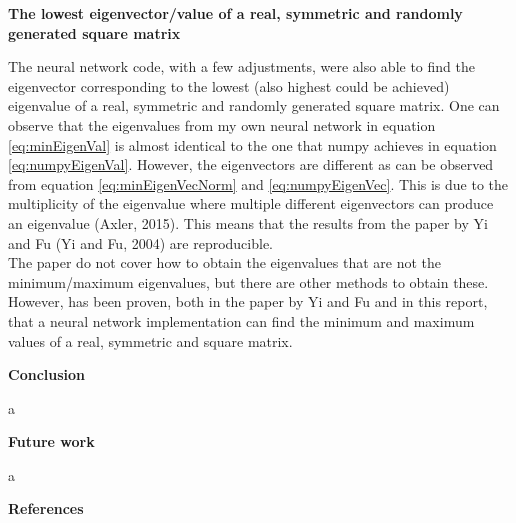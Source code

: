 \documentclass[12pt,a4paper]{article}
\begin{document}
\begin{center}
\large{\textbf{The lowest eigenvector/value of a real, symmetric and randomly generated square matrix}}
\end{center}

\noindent The neural network code, with a few adjustments, were also able to find the eigenvector corresponding to the lowest (also highest could be achieved) eigenvalue of a real, symmetric and randomly generated square matrix. One can observe that the eigenvalues  from my own neural network in equation \ref{eq:minEigenVal} is almost identical to the one that numpy achieves in equation \ref{eq:numpyEigenVal}. However, the eigenvectors are different as can be observed from equation \ref{eq:minEigenVecNorm} and \ref{eq:numpyEigenVec}. This is due to the multiplicity of the eigenvalue where multiple different eigenvectors can produce an eigenvalue (Axler, 2015). This means that the results from the paper by Yi and Fu (Yi and Fu, 2004) are reproducible. 
\\
The paper do not cover how to obtain the eigenvalues that are not the minimum/maximum eigenvalues, but there are other methods to obtain these. However, has been proven, both in the paper by Yi and Fu and in this report, that a neural network implementation can find the minimum and maximum values of a real, symmetric and square matrix.

\newpage

\begin{center}
\Large{\textbf{Conclusion}}
\end{center}

\noindent a

\newpage

\begin{center}
\Large{\textbf{Future work}}
\end{center}

\noindent a

\newpage

\begin{center}
\Large{\textbf{References}}
\end{center}
\end{document}
